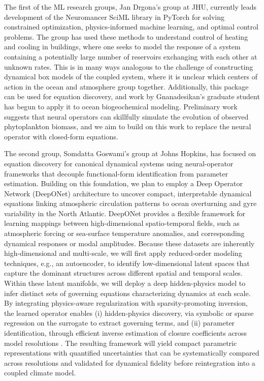 \documentclass{article}
\begin{document}
The first of the ML research groups, Jan Drgona's group at JHU, currently leads development of the  Neuromancer SciML library \citep{drgona2023domain} in PyTorch for solving constrained optimization, physics-informed machine learning, and optimal control problems. The group has used these methods to understand control of heating and cooling in buildings, where one seeks to model the response of a system containing a potentially large number of reservoirs exchanging with each other at unknown rates\citep{das2024machine,drgona2020all}. This is in many ways analogous to the challenge of constructing dynamical box models of the coupled system, where it is unclear which centers of action in the ocean and atmosphere group together. Additionally, this package can be used for equation discovery, and work by Gnanadesikan's graduate student has begun to apply it to ocean biogeochemical modeling. Preliminary work suggests that neural operators can skillfully simulate the evolution of observed phytoplankton biomass, and we aim to build on this work to replace the neural operator with closed-form equations.

The second group, Somdatta Goswami's group at Johns Hopkins, has focused on equation discovery for canonical dynamical systems using neural-operator frameworks that decouple functional-form identification from parameter estimation. Building on this foundation, we plan to employ a Deep Operator Network (DeepONet) architecture to uncover compact, interpretable dynamical equations linking atmospheric circulation patterns to ocean overturning and gyre variability in the North Atlantic. DeepONet provides a flexible framework for learning mappings between high-dimensional spatio-temporal fields, such as atmospheric forcing or sea-surface temperature anomalies, and corresponding dynamical responses or modal amplitudes. Because these datasets are inherently high-dimensional and multi-scale, we will first apply reduced-order modeling techniques, e.g., an autoencoder, to identify low-dimensional latent spaces that capture the dominant structures across different spatial and temporal scales. Within these latent manifolds, we will deploy a deep hidden-physics model to infer distinct sets of governing equations characterizing dynamics at each scale. By integrating physics-aware regularization with sparsity-promoting inversion, the learned operator enables (i) hidden-physics discovery, via symbolic or sparse regression on the surrogate to extract governing terms, and (ii) parameter identification, through efficient inverse estimation of closure coefficients across model resolutions \citep{goswami2025121284,kag2024learning,mandl2025separable}. The resulting framework will yield compact parametric representations with quantified uncertainties that can be systematically compared across resolutions and validated for dynamical fidelity before reintegration into a coupled climate model. 
\end{document}
